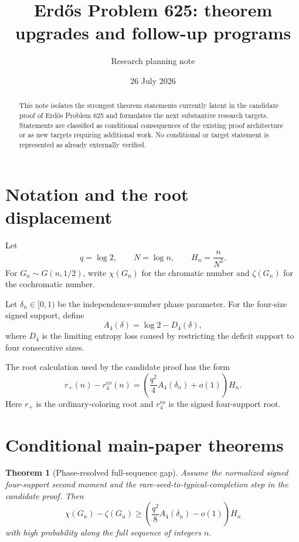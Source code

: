 \documentclass[11pt]{article}
\title{Erd\H{o}s Problem 625: theorem upgrades and follow-up programs}
\author{Research planning note}
\date{26 July 2026}
\newtheorem{theorem}{Theorem}[section]
\theoremstyle{definition}
\newcommand{\Afour}{A_4}
\newcommand{\Dfour}{D_4}
\newcommand{\rplus}{r_+}
\newcommand{\rco}{r_4^{\mathrm{co}}}
\begin{document}
\maketitle

\begin{abstract}
This note isolates the strongest theorem statements currently latent in the
candidate proof of Erd\H{o}s Problem 625 and formulates the next substantive
research targets.  Statements are classified as conditional consequences of
the existing proof architecture or as new targets requiring additional work.
No conditional or target statement is represented as already externally
verified.
\end{abstract}

\section{Notation and the root displacement}

Let
\[
 q=\log 2,\qquad N=\log n,\qquad H_n=\frac{n}{N^3}.
\]
For $G_n\sim G(n,1/2)$, write $\chi(G_n)$ for the chromatic number and
$\zeta(G_n)$ for the cochromatic number.

Let $\delta_n\in[0,1)$ be the independence-number phase parameter.  For the
four-size signed support, define
\[
 \Afour(\delta)=\log 2-\Dfour(\delta),
\]
where $\Dfour$ is the limiting entropy loss caused by restricting the deficit
support to four consecutive sizes.

The root calculation used by the candidate proof has the form
\begin{equation}
 \rplus(n)-\rco(n)
 =\left(\frac{q^2}{4}\Afour(\delta_n)+o(1)\right)H_n.
 \label{eq:root-gap}
\end{equation}
Here $\rplus$ is the ordinary-coloring root and $\rco$ is the signed
four-support root.

\section{Conditional main-paper theorems}

\begin{theorem}[Phase-resolved full-sequence gap]
\label{thm:phase-gap}
Assume the normalized signed four-support second moment and the
rare-seed-to-typical-completion step in the candidate proof.  Then
\[
 \chi(G_n)-\zeta(G_n)
 \ge
 \left(\frac{q^2}{8}\Afour(\delta_n)-o(1)\right)H_n
\]
with high probability along the full sequence of integers $n$.
\end{theorem}
\end{document}
